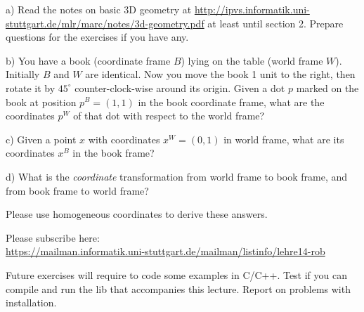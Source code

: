

\renewcommand{\course}{Robotics}
\renewcommand{\coursepicture}{roboticsLecture}
\renewcommand{\coursedate}{Winter 2014}
\renewcommand{\exnum}{2}

\exercises


\exercisestitle



a) Read the notes on basic 3D geometry at
{\tiny\url{http://ipvs.informatik.uni-stuttgart.de/mlr/marc/notes/3d-geometry.pdf}} at
least until section 2. Prepare questions for the exercises if you have any.

b) You have a book (coordinate frame $B$) lying on the table (world
frame $W$). Initially $B$ and $W$ are identical. Now you move the book 1
unit to the right, then rotate it by $45^\circ$ counter-clock-wise
around its origin. Given a dot $p$ marked on the book at position
$p^B=(1,1)$ in the book coordinate frame, what are the coordinates
$p^W$ of that dot with respect to the world frame?

c) Given a point $x$ with coordinates $x^W=(0,1)$ in world
frame, what are its coordinates $x^B$ in the book frame?

d) What is the \emph{coordinate} transformation from world frame to book
frame, and from book frame to world frame?

Please use homogeneous coordinates to derive these answers.




Please subscribe here:\\
{\small\url{https://mailman.informatik.uni-stuttgart.de/mailman/listinfo/lehre14-rob}}



Future exercises will require to code some examples in C/C++. Test if you
can compile and run the lib that accompanies this lecture. Report
on problems with installation.

